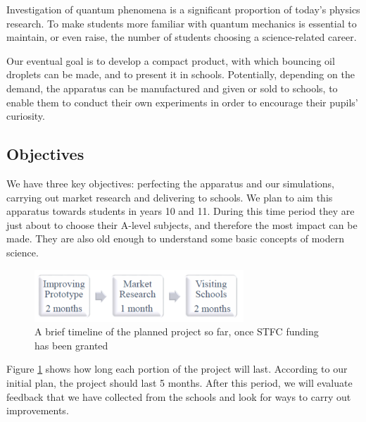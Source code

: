 Investigation of quantum phenomena is a significant proportion of today's physics research. To make students more familiar with quantum mechanics is essential to maintain, or even raise, the number of students choosing a science-related career.

Our eventual goal is to develop a compact product, with which bouncing oil droplets can be made, and to present it in schools. Potentially, depending on the demand, the apparatus can be manufactured and given or sold to schools, to enable them to conduct their own experiments in order to encourage their pupils' curiosity. 

\subsection{Objectives}

We have three key objectives: perfecting the apparatus and our simulations, carrying out market research and delivering to schools. We plan to aim this apparatus towards students in years 10 and 11. During this time period they are just about to choose their A-level subjects, and therefore the most impact can be made. They are also old enough to understand some basic concepts of modern science.

\begin{center}
\begin{figure}[htb]
    \centering
    \includegraphics[width=0.7\textwidth]{education/STFCproposal/STFCProposal_Timeline2.png}
    \caption{A brief timeline of the planned project so far, once STFC funding has been granted}
    \label{fig:PropTimeline_STFC}
\end{figure} 
\end{center}

Figure \ref{fig:PropTimeline_STFC} shows how long each portion of the project will last. According to our initial plan, the project should last 5 months. After this period, we will evaluate feedback that we have collected from the schools and look for ways to carry out improvements.

